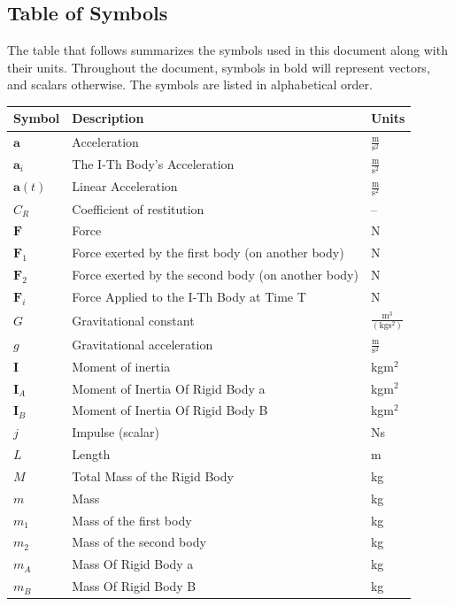 \documentclass[12pt]{article}
\begin{document}
\subsection{Table of Symbols}
\label{Sec:ToS}
The table that follows summarizes the symbols used in this document along with their units. Throughout the document, symbols in bold will represent vectors, and scalars otherwise. The symbols are listed in alphabetical order.
\begin{longtabu}{l X[l] l}
\toprule
Symbol & Description & Units
\\
\midrule
\endhead
$\mathbf{a}$ & Acceleration & $\frac{\text{m}}{\text{s}^{2}}$
\\
${\mathbf{a}_{i}}$ & The I-Th Body's Acceleration & $\frac{\text{m}}{\text{s}^{2}}$
\\
$\mathbf{a}(t)$ & Linear Acceleration & $\frac{\text{m}}{\text{s}^{2}}$
\\
${C_{R}}$ & Coefficient of restitution & --
\\
$\mathbf{F}$ & Force & N
\\
${\mathbf{F}_{1}}$ & Force exerted by the first body (on another body) & N
\\
${\mathbf{F}_{2}}$ & Force exerted by the second body (on another body) & N
\\
${\mathbf{F}_{i}}$ & Force Applied to the I-Th Body at Time T & N
\\
$G$ & Gravitational constant & $\frac{\text{m}^{3}}{(\text{kg}\text{s}^{2})}$
\\
$g$ & Gravitational acceleration & $\frac{\text{m}}{\text{s}^{2}}$
\\
$\mathbf{I}$ & Moment of inertia & kg$\text{m}^{2}$
\\
${\mathbf{I}_{A}}$ & Moment of Inertia Of Rigid Body a & kg$\text{m}^{2}$
\\
${\mathbf{I}_{B}}$ & Moment of Inertia Of Rigid Body B & kg$\text{m}^{2}$
\\
$j$ & Impulse (scalar) & Ns
\\
$L$ & Length & m
\\
$M$ & Total Mass of the Rigid Body & kg
\\
$m$ & Mass & kg
\\
${m_{1}}$ & Mass of the first body & kg
\\
${m_{2}}$ & Mass of the second body & kg
\\
${m_{A}}$ & Mass Of Rigid Body a & kg
\\
${m_{B}}$ & Mass Of Rigid Body B & kg
\\

\end{longtabu}
\end{document}

